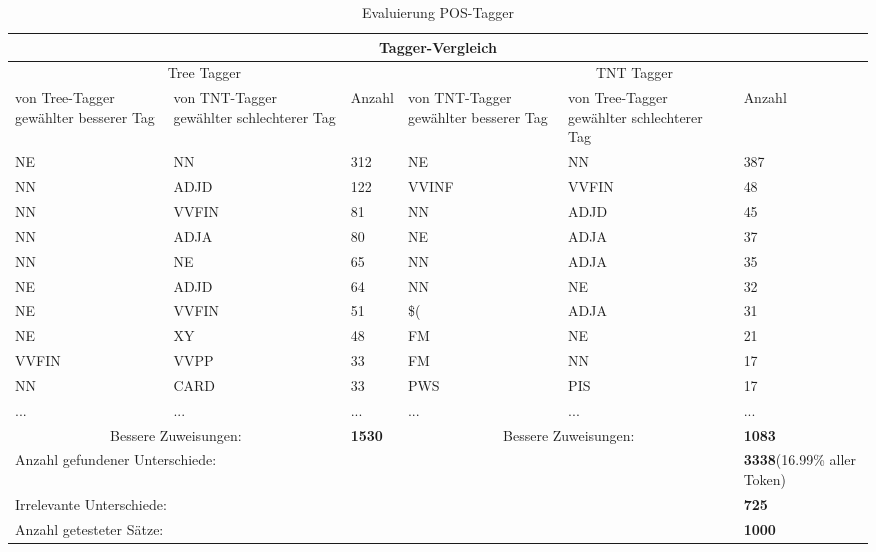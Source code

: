 \documentclass[11pt]{article}
\begin{document}
\begin{table}[h]
\begin{center}
\begin{tabular}{|*{6}{p{}|}}\hline
\multicolumn{6}{|c|}{Tagger-Vergleich}\\\hline\hline
\multicolumn{3}{|c|}{Tree Tagger}&\multicolumn{3}{c|}{TNT Tagger}\\\hline
von Tree-Tagger gewählter besserer Tag & von TNT-Tagger gewählter schlechterer
Tag & Anzahl & von TNT-Tagger gewählter besserer Tag & von Tree-Tagger
gewählter schlechterer Tag & Anzahl\\\hline 
NE & NN & 312 & NE & NN & 387\\
NN & ADJD & 122 & VVINF & VVFIN & 48\\
NN & VVFIN & 81 & NN & ADJD & 45\\
NN & ADJA & 80 & NE & ADJA & 37\\
NN & NE & 65 & NN & ADJA & 35\\
NE & ADJD & 64 & NN & NE & 32\\
NE & VVFIN & 51 & \$( & ADJA & 31\\
NE & XY & 48 & FM & NE & 21\\
VVFIN & VVPP & 33 & FM & NN & 17\\
NN & CARD & 33 & PWS & PIS & 17\\
... & ... & ... & ... & ... & ...\\
\hline
\multicolumn{2}{|c|}{Bessere Zuweisungen:} & \textbf{1530} &
\multicolumn{2}{|c|}{Bessere Zuweisungen:} & \textbf{1083}\\\hline\hline
\multicolumn{5}{|l|}{Anzahl gefundener Unterschiede:}&
\textbf{3338}\newline \small{(16.99\% aller Token)}\\\hline
\multicolumn{5}{|l|}{Irrelevante Unterschiede:}&\textbf{725}\\\hline\multicolumn{5}{|l|}{Anzahl
getesteter Sätze:}& \textbf{1000}\\\hline
\end{tabular}
\end{center}
\caption{Evaluierung POS-Tagger}
\end{table}
\end{document}
